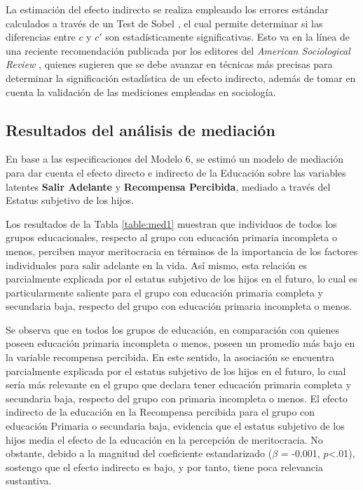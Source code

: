 \documentclass[12pt]{article}
\begin{document}
La estimación del efecto indirecto se realiza empleando los errores estándar calculados a través de un Test de Sobel \citep{Sobel1987,Rosseel2012}, el cual permite determinar si las diferencias entre $c$ y $c'$ son estadísticamente significativas. Esto va en la línea de una reciente recomendación publicada por los editores del \textit{American Sociological Review} \citep{Mustilloetal2018}, quienes sugieren que se debe avanzar en técnicas más precisas para determinar la significación estadística de un efecto indirecto, además de tomar en cuenta la validación de las mediciones empleadas en sociología.

\newpage

\subsection*{Resultados del análisis de mediación}

En base a las especificaciones del Modelo 6, se estimó un modelo de mediación para dar cuenta el efecto directo e indirecto de la Educación sobre las variables latentes \textbf{Salir Adelante} y \textbf{Recompensa Percibida}, mediado a través del Estatus subjetivo de los hijos.  

Los resultados de la Tabla \ref{table:med1} muestran que individuos de todos los grupos educacionales, respecto al grupo con educación primaria incompleta o menos, perciben mayor meritocracia en términos de la importancia de los factores individuales para salir adelante en la vida. Así mismo, esta relación es parcialmente explicada por el estatus subjetivo de los hijos en el futuro, lo cual es particularmente saliente para el grupo con educación primaria completa y secundaria baja, respecto del grupo con educación primaria incompleta o menos. 

Se observa que en todos los grupos de educación, en comparación con quienes poseen educación primaria incompleta o menos, poseen un promedio más bajo en la variable recompensa percibida. En este sentido, la asociación se encuentra parcialmente explicada por el estatus subjetivo de los hijos en el futuro, lo cual sería más relevante en el grupo que declara tener educación primaria completa y secundaria baja, respecto del grupo con primaria incompleta o menos. El efecto indirecto de la educación en la Recompensa percibida para el grupo con educación Primaria o secundaria baja, evidencia que el estatus subjetivo de los hijos media el efecto de la educación en la percepción de meritocracia. No obstante, debido a la magnitud del coeficiente estandarizado ($\beta$ = -0.001, $p$<.01), sostengo que el efecto indirecto es bajo, y por tanto, tiene poca relevancia sustantiva.
   
\end{document}
